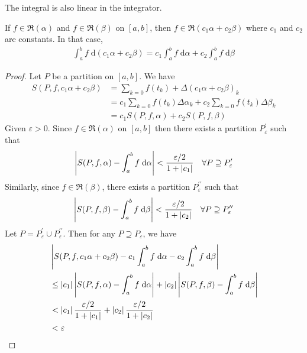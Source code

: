 \documentclass[thmcnt=section, 12pt]{my-elegantbook}
\begin{document}

\par The integral is also linear in the integrator.

\begin{theorem} \label{thm:19}
    If $f \in \mathfrak{R}(\alpha)$ and $f \in \mathfrak{R}(\beta)$ on $[a,b]$, then $f \in \mathfrak{R}(c_1 \alpha + c_2 \beta)$ where $c_1$ and $c_2$ are constants. In that case,
    \begin{align*}
        \int_a^b f \; \mathrm{d}(c_1 \alpha + c_2 \beta)
        = c_1 \int_a^b f \; \mathrm{d}\alpha
        + c_2 \int_a^b f \; \mathrm{d}\beta
    \end{align*}
\end{theorem}

\begin{proof}
    Let $P$ be a partition on $[a,b]$. We have
    \begin{align*}
        S(P, f, c_1 \alpha + c_2 \beta)
         & = \sum_{k=0} f(t_k) + \Delta(c_1 \alpha + c_2 \beta)_k \\
         & = c_1 \sum_{k=0} f(t_k) \Delta\alpha_k
        + c_2 \sum_{k=0} f(t_k) \Delta\beta_k                     \\
         & = c_1 S(P, f, \alpha) + c_2 S(P, f, \beta)
    \end{align*}
    Given $\varepsilon > 0$. Since $f \in \mathfrak{R}(\alpha)$ on $[a,b]$ then there exists a partition $P_\varepsilon^{\prime}$
    such that
    \begin{align*}
        \left\lvert S(P, f, \alpha) - \int_a^b f \; \mathrm{d}\alpha \right\rvert < \frac{\varepsilon / 2}{1 + \left\lvert c_1 \right\rvert}
        \quad \forall P \supseteq P_\varepsilon^{\prime}
    \end{align*}
    Similarly, since $f \in \mathfrak{R}(\beta)$, there exists a partition $P_\varepsilon^{\prime\prime}$ such that
    \begin{align*}
        \left\lvert S(P, f, \beta) - \int_a^b f \; \mathrm{d}\beta \right\rvert < \frac{\varepsilon / 2}{1 + \left\lvert c_2 \right\rvert}
        \quad \forall P \supseteq P_\varepsilon^{\prime\prime}
    \end{align*}
    Let $P = P_\varepsilon^{\prime} \cup P_\varepsilon^{\prime\prime}$. Then for any $P \supseteq P_\varepsilon$, we have
    \begin{align*}
         & \left\lvert 
            S(P, f, c_1 \alpha + c_2 \beta)
            - c_1 \int_a^b f \; \mathrm{d}\alpha
            - c_2 \int_a^b f \; \mathrm{d}\beta
         \right\rvert                                                                      \\
         & \leq \left\lvert c_1 \right\rvert \left\lvert S(P,f,\alpha) - \int_a^b f \; \mathrm{d}\alpha \right\rvert
        + \left\lvert c_2 \right\rvert \left\lvert S(P,f,\beta) - \int_a^b f \; \mathrm{d}\beta \right\rvert         \\
         & < \left\lvert c_1 \right\rvert \frac{\varepsilon / 2}{1 + \left\lvert c_1 \right\rvert}
        + \left\lvert c_2 \right\rvert \frac{\varepsilon / 2}{1 + \left\lvert c_2 \right\rvert}                      \\
         & < \varepsilon
    \end{align*}
\end{proof}
\end{document}
